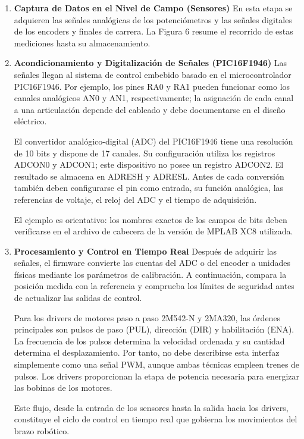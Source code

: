 \documentclass[11pt]{article}
\begin{document}
\begin{enumerate}
	\item \textbf{Captura de Datos en el Nivel de Campo (Sensores)} En esta etapa se adquieren las señales analógicas de los potenciómetros y las señales digitales de los encoders y finales de carrera. La Figura 6 resume el recorrido de estas mediciones hasta su almacenamiento.
	

	
	\item \textbf{Acondicionamiento y Digitalización de Señales (PIC16F1946)} Las señales llegan al sistema de control embebido basado en el microcontrolador PIC16F1946. Por ejemplo, los pines RA0 y RA1 pueden funcionar como los canales analógicos AN0 y AN1, respectivamente; la asignación de cada canal a una articulación depende del cableado y debe documentarse en el diseño eléctrico.
	
	El convertidor analógico-digital (ADC) del PIC16F1946 tiene una resolución de 10 bits y dispone de 17 canales. Su configuración utiliza los registros ADCON0 y ADCON1; este dispositivo no posee un registro ADCON2. El resultado se almacena en ADRESH y ADRESL. Antes de cada conversión también deben configurarse el pin como entrada, su función analógica, las referencias de voltaje, el reloj del ADC y el tiempo de adquisición.
	

	
	El ejemplo es orientativo: los nombres exactos de los campos de bits deben verificarse en el archivo de cabecera de la versión de MPLAB XC8 utilizada.
	
	\item \textbf{Procesamiento y Control en Tiempo Real} Después de adquirir las señales, el firmware convierte las cuentas del ADC o del encoder a unidades físicas mediante los parámetros de calibración. A continuación, compara la posición medida con la referencia y comprueba los límites de seguridad antes de actualizar las salidas de control.
	
	Para los drivers de motores paso a paso 2M542-N y 2MA320, las órdenes principales son pulsos de paso (PUL), dirección (DIR) y habilitación (ENA). La frecuencia de los pulsos determina la velocidad ordenada y su cantidad determina el desplazamiento. Por tanto, no debe describirse esta interfaz simplemente como una señal PWM, aunque ambas técnicas empleen trenes de pulsos. Los drivers proporcionan la etapa de potencia necesaria para energizar las bobinas de los motores.
	
	Este flujo, desde la entrada de los sensores hasta la salida hacia los drivers, constituye el ciclo de control en tiempo real que gobierna los movimientos del brazo robótico.
	

\end{enumerate}
\end{document}
